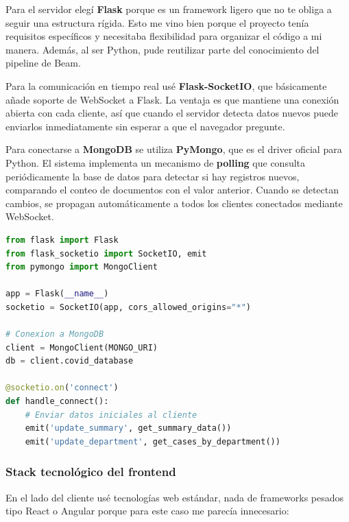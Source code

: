 \documentclass[12pt,a4paper]{article}
\begin{document}
Para el servidor elegí \textbf{Flask} porque es un framework ligero que no te obliga a seguir una estructura rígida. Esto me vino bien porque el proyecto tenía requisitos específicos y necesitaba flexibilidad para organizar el código a mi manera. Además, al ser Python, pude reutilizar parte del conocimiento del pipeline de Beam.

Para la comunicación en tiempo real usé \textbf{Flask-SocketIO}, que básicamente añade soporte de WebSocket a Flask. La ventaja es que mantiene una conexión abierta con cada cliente, así que cuando el servidor detecta datos nuevos puede enviarlos inmediatamente sin esperar a que el navegador pregunte.

Para conectarse a \textbf{MongoDB} se utiliza \textbf{PyMongo}, que es el driver oficial para Python. El sistema implementa un mecanismo de \textbf{polling} que consulta periódicamente la base de datos para detectar si hay registros nuevos, comparando el conteo de documentos con el valor anterior. Cuando se detectan cambios, se propagan automáticamente a todos los clientes conectados mediante WebSocket.

\begin{lstlisting}[language=Python, caption={Configuración del servidor Flask con WebSocket}, label={lst:flask-config}]
from flask import Flask
from flask_socketio import SocketIO, emit
from pymongo import MongoClient

app = Flask(__name__)
socketio = SocketIO(app, cors_allowed_origins="*")

# Conexion a MongoDB
client = MongoClient(MONGO_URI)
db = client.covid_database

@socketio.on('connect')
def handle_connect():
    # Enviar datos iniciales al cliente
    emit('update_summary', get_summary_data())
    emit('update_department', get_cases_by_department())
\end{lstlisting}

\subsubsection{Stack tecnológico del frontend}

En el lado del cliente usé tecnologías web estándar, nada de frameworks pesados tipo React o Angular porque para este caso me parecía innecesario:
\end{document}
